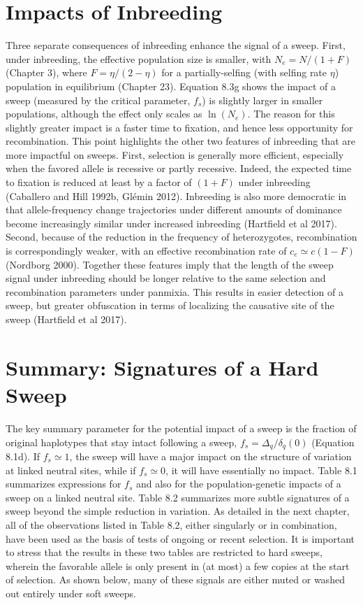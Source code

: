 \documentclass{article}
\begin{document}
\section{Impacts of Inbreeding}
Three separate consequences of inbreeding enhance the signal of a sweep. First, under inbreeding, the effective population size is smaller, with  $ N_e = N/(1 + F) $ (Chapter 3), where  $ F = \eta/(2 - \eta) $ for a partially-selfing (with selfing rate  $ \eta $) population in equilibrium (Chapter 23). Equation 8.3g shows the impact of a sweep (measured by the critical parameter,  $ f_s $) is slightly larger in smaller populations, although the effect only scales as  $ \ln(N_e) $. The reason for this slightly greater impact is a faster time to fixation, and hence less opportunity for recombination. This point highlights the other two features of inbreeding that are more impactful on sweeps. First, selection is generally more efficient, especially when the favored allele is recessive or partly recessive. Indeed, the expected time to fixation is reduced at least by a factor of  $ (1 + F) $ under inbreeding (Caballero and Hill 1992b, Glémin 2012). Inbreeding is also more democratic in that allele-frequency change trajectories under different amounts of dominance become increasingly similar under increased inbreeding (Hartfield et al 2017). Second, because of the reduction in the frequency of heterozygotes, recombination is correspondingly weaker, with an effective recombination rate of  $ c_e \simeq c(1 - F) $ (Nordborg 2000). Together these features imply that the length of the sweep signal under inbreeding should be longer relative to the same selection and recombination parameters under panmixia. This results in easier detection of a sweep, but greater obfuscation in terms of localizing the causative site of the sweep (Hartfield et al 2017).

\section{Summary: Signatures of a Hard Sweep}
The key summary parameter for the potential impact of a sweep is the fraction of original haplotypes that stay intact following a sweep,  $ f_s = \Delta_q / \delta_q(0) $ (Equation 8.1d). If  $ f_s \simeq 1 $, the sweep will have a major impact on the structure of variation at linked neutral sites, while if  $ f_s \simeq 0 $, it will have essentially no impact. Table 8.1 summarizes expressions for  $ f_s $ and also for the population-genetic impacts of a sweep on a linked neutral site. Table 8.2 summarizes more subtle signatures of a sweep beyond the simple reduction in variation. As detailed in the next chapter, all of the observations listed in Table 8.2, either singularly or in combination, have been used as the basis of tests of ongoing or recent selection. It is important to stress that the results in these two tables are restricted to hard sweeps, wherein the favorable allele is only present in (at most) a few copies at the start of selection. As shown below, many of these signals are either muted or washed out entirely under soft sweeps.
\end{document}
